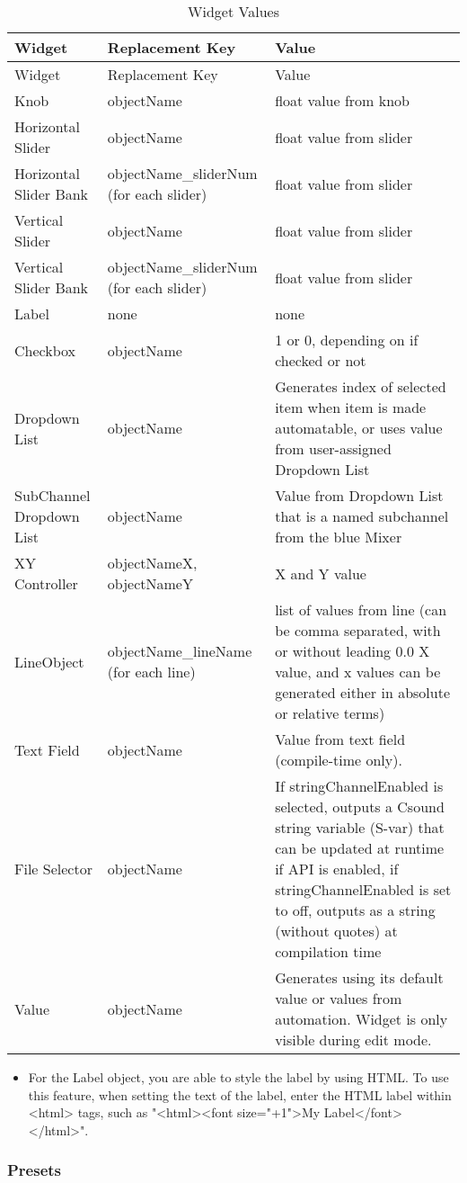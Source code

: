 \begin{longtable}[]{@{}lll@{}}
\caption{Widget Values}\tabularnewline
\toprule
Widget & Replacement Key & Value\tabularnewline
\midrule
\endfirsthead
\toprule
Widget & Replacement Key & Value\tabularnewline
\midrule
\endhead
Knob & objectName & float value from knob\tabularnewline
Horizontal Slider & objectName & float value from slider\tabularnewline
Horizontal Slider Bank & objectName\_sliderNum (for each slider) & float
value from slider\tabularnewline
Vertical Slider & objectName & float value from slider\tabularnewline
Vertical Slider Bank & objectName\_sliderNum (for each slider) & float
value from slider\tabularnewline
Label & none & none\tabularnewline
Checkbox & objectName & 1 or 0, depending on if checked or
not\tabularnewline
Dropdown List & objectName & Generates index of selected item when item
is made automatable, or uses value from user-assigned Dropdown
List\tabularnewline
SubChannel Dropdown List & objectName & Value from Dropdown List that is
a named subchannel from the blue Mixer\tabularnewline
XY Controller & objectNameX, objectNameY & X and Y value\tabularnewline
LineObject & objectName\_lineName (for each line) & list of values from
line (can be comma separated, with or without leading 0.0 X value, and x
values can be generated either in absolute or relative
terms)\tabularnewline
Text Field & objectName & Value from text field (compile-time
only).\tabularnewline
File Selector & objectName & If stringChannelEnabled is selected,
outputs a Csound string variable (S-var) that can be updated at runtime
if API is enabled, if stringChannelEnabled is set to off, outputs as a
string (without quotes) at compilation time\tabularnewline
Value & objectName & Generates using its default value or values from
automation. Widget is only visible during edit mode.\tabularnewline
\bottomrule
\end{longtable}

\begin{itemize}
\item
  For the Label object, you are able to style the label by using HTML.
  To use this feature, when setting the text of the label, enter the
  HTML label within \textless{}html\textgreater{} tags, such as
  "\textless{}html\textgreater{}\textless{}font
  size="+1"\textgreater{}My
  Label\textless{}/font\textgreater{}\textless{}/html\textgreater{}".
\end{itemize}

\subsubsection{Presets}

